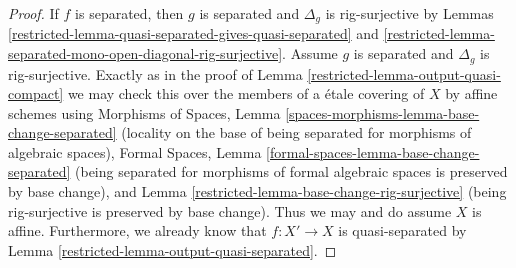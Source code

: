 \begin{proof}

If $f$ is separated, then $g$ is separated and $\Delta_g$
is rig-surjective by
Lemmas \ref{restricted-lemma-quasi-separated-gives-quasi-separated} and
\ref{restricted-lemma-separated-mono-open-diagonal-rig-surjective}.
Assume $g$ is separated and $\Delta_g$ is rig-surjective.
Exactly as in the proof of
Lemma \ref{restricted-lemma-output-quasi-compact}
we may check this over the members of a \'etale covering of $X$
by affine schemes using
Morphisms of Spaces, Lemma \ref{spaces-morphisms-lemma-base-change-separated}
(locality on the base of being separated for morphisms of algebraic spaces),
Formal Spaces, Lemma \ref{formal-spaces-lemma-base-change-separated}
(being separated for morphisms of formal algebraic spaces is preserved
by base change), and
Lemma \ref{restricted-lemma-base-change-rig-surjective} (being rig-surjective
is preserved by base change).
Thus we may and do assume $X$ is affine. Furthermore,
we already know that $f : X' \to X$ is quasi-separated by
Lemma \ref{restricted-lemma-output-quasi-separated}.


\end{proof}
